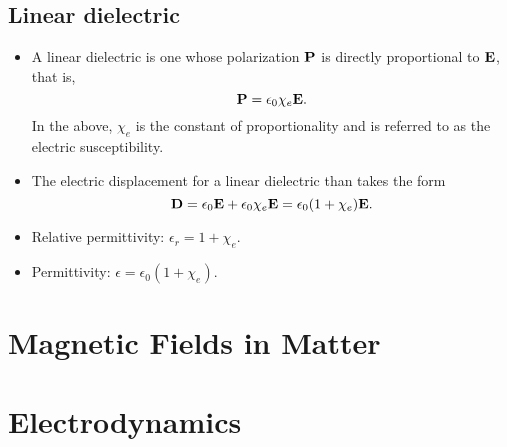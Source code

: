 \documentclass[11pt]{article}
\begin{document}
\subsection{Linear dielectric}
\begin{itemize}
    \item A linear dielectric is one whose polarization $\mathbf{P}$ is directly proportional to $\mathbf{E}$, that is,
    \begin{equation}
        \mathbf{P} = \epsilon_0 \chi_e \mathbf{E}.
    \end{equation}
    In the above, $\chi_e$ is the constant of proportionality and is referred to as the electric susceptibility.
    \item The electric displacement for a linear dielectric than takes the form
    \begin{equation}
        \mathbf{D} = \epsilon_0 \mathbf{E} + \epsilon_0 \chi_e \mathbf{E} = \epsilon_0 (1 + \chi_e) \mathbf{E}.
    \end{equation}
    \item Relative permittivity: $\epsilon_r = 1 + \chi_e$.
    \item Permittivity: $\epsilon = \epsilon_0 (1 + \chi_e)$.
\end{itemize}


\section{Magnetic Fields in Matter}

\section{Electrodynamics}

\end{document}
